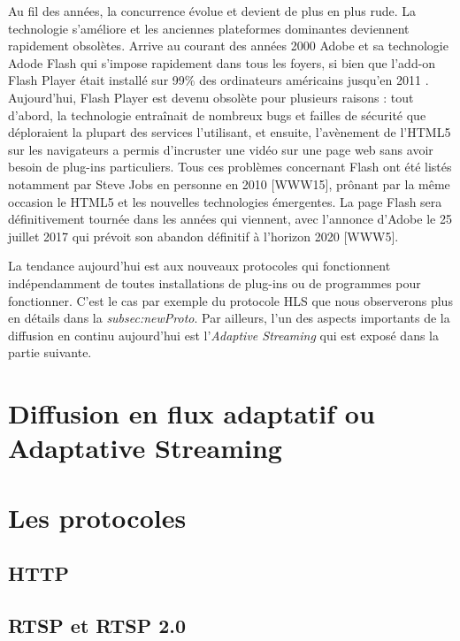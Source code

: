 \documentclass{polytech/polytech}
\begin{document}
Au fil des années, la concurrence évolue et devient de plus en plus rude. La technologie s’améliore et les anciennes plateformes dominantes deviennent rapidement obsolètes. Arrive au courant des années 2000 Adobe et sa technologie Adode Flash qui s’impose rapidement dans tous les foyers, si bien que l’add-on Flash Player était installé sur 99\% des ordinateurs américains jusqu’en 2011 \cite{_chronique_streaming_2010}. Aujourd’hui, Flash Player est devenu obsolète pour plusieurs raisons : tout d’abord, la technologie entraînait de nombreux bugs et failles de sécurité que déploraient la plupart des services l’utilisant, et ensuite, l’avènement de l’HTML5 sur les navigateurs a permis d’incruster une vidéo sur une page web sans avoir besoin de plug-ins particuliers. Tous ces problèmes concernant Flash ont été listés notamment par Steve Jobs en personne en 2010 [WWW15], prônant par la même occasion le HTML5 et les nouvelles technologies émergentes. La page Flash sera définitivement tournée dans les années qui viennent, avec l’annonce d’Adobe le 25 juillet 2017 qui prévoit son abandon définitif à l’horizon 2020 [WWW5].

La tendance aujourd’hui est aux nouveaux protocoles qui fonctionnent indépendamment de toutes installations de plug-ins ou de programmes pour fonctionner. C’est le cas par exemple du protocole HLS que nous observerons plus en détails dans la \textit{subsec:newProto}. Par ailleurs, l’un des aspects importants de la diffusion en continu aujourd’hui est l’\textit{Adaptive Streaming} qui est exposé dans la partie suivante.

\section{Diffusion en flux adaptatif ou Adaptative Streaming}
\label{sec:adaptative_streaming}

\section{Les protocoles}
\label{sec:protocoles}

\subsection{HTTP}

\subsection{RTSP et RTSP 2.0}
\end{document}
